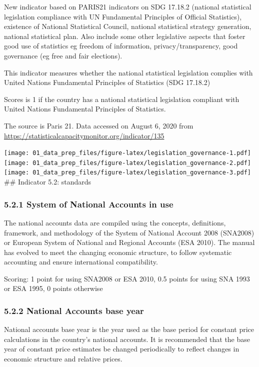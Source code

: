 \documentclass[]{article}
\begin{document}
New indicator based on PARIS21 indicators on SDG 17.18.2 (national
statistical legislation compliance with UN Fundamental Principles of
Official Statistics), existence of National Statistical Council,
national statistical strategy generation, national statistical plan.
Also include some other legislative aspects that foster good use of
statistics eg freedom of information, privacy/transparency, good
governance (eg free and fair elections).

This indicator measures whether the national statistical legislation
complies with United Nations Fundamental Principles of Statistics (SDG
17.18.2)

Scores is 1 if the country has a national statistical legislation
compliant with United Nations Fundamental Principles of Statistics.

The source is Paris 21. Data accessed on August 6, 2020 from
\url{https://statisticalcapacitymonitor.org/indicator/135}

\texttt{[image: 01\_data\_prep\_files/figure-latex/legislation\_governance-1.pdf]}
\texttt{[image: 01\_data\_prep\_files/figure-latex/legislation\_governance-2.pdf]}
\texttt{[image: 01\_data\_prep\_files/figure-latex/legislation\_governance-3.pdf]}
\#\# Indicator 5.2: standards

\hypertarget{system-of-national-accounts-in-use}{%
\subsubsection{5.2.1 System of National Accounts in
use}\label{system-of-national-accounts-in-use}}

The national accounts data are compiled using the concepts, definitions,
framework, and methodology of the System of National Account 2008
(SNA2008) or European System of National and Regional Accounts (ESA
2010). The manual has evolved to meet the changing economic structure,
to follow systematic accounting and ensure international compatibility.

Scoring: 1 point for using SNA2008 or ESA 2010, 0.5 points for using SNA
1993 or ESA 1995, 0 points otherwise

\hypertarget{national-accounts-base-year}{%
\subsubsection{5.2.2 National Accounts base
year}\label{national-accounts-base-year}}

National accounts base year is the year used as the base period for
constant price calculations in the country's national accounts. It is
recommended that the base year of constant price estimates be changed
periodically to reflect changes in economic structure and relative
prices.
\end{document}
